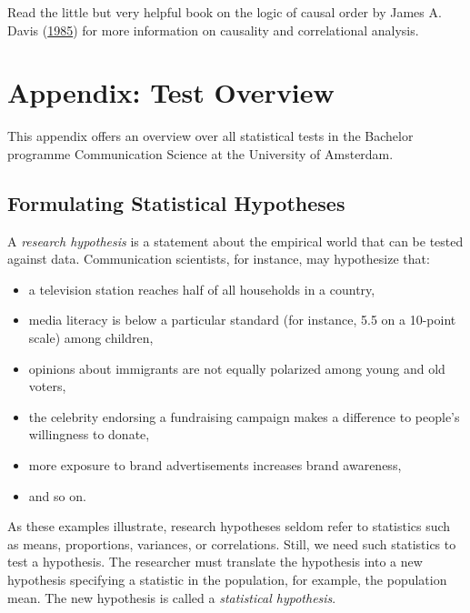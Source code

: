 \documentclass[a4paper]{book}
\theoremstyle{definition}
\theoremstyle{definition}
\theoremstyle{definition}
\theoremstyle{remark}
\begin{document}
Read the little but very helpful book on the logic of causal order by
James A. Davis (\protect\hyperlink{ref-RefWorks:1494}{1985}) for more
information on causality and correlational analysis.

\chapter*{Appendix: Test Overview}\label{appendix-test-overview}

This appendix offers an overview over all statistical tests in the
Bachelor programme Communication Science at the University of Amsterdam.

\section*{Formulating Statistical
Hypotheses}\label{formulating-statistical-hypotheses}

A \emph{research hypothesis} is a statement about the empirical world
that can be tested against data. Communication scientists, for instance,
may hypothesize that:

\begin{itemize}
\item
  a television station reaches half of all households in a country,
\item
  media literacy is below a particular standard (for instance, 5.5 on a
  10-point scale) among children,
\item
  opinions about immigrants are not equally polarized among young and
  old voters,
\item
  the celebrity endorsing a fundraising campaign makes a difference to
  people's willingness to donate,
\item
  more exposure to brand advertisements increases brand awareness,
\item
  and so on.
\end{itemize}

As these examples illustrate, research hypotheses seldom refer to
statistics such as means, proportions, variances, or correlations.
Still, we need such statistics to test a hypothesis. The researcher must
translate the hypothesis into a new hypothesis specifying a statistic in
the population, for example, the population mean. The new hypothesis is
called a \emph{statistical hypothesis}.
\end{document}
